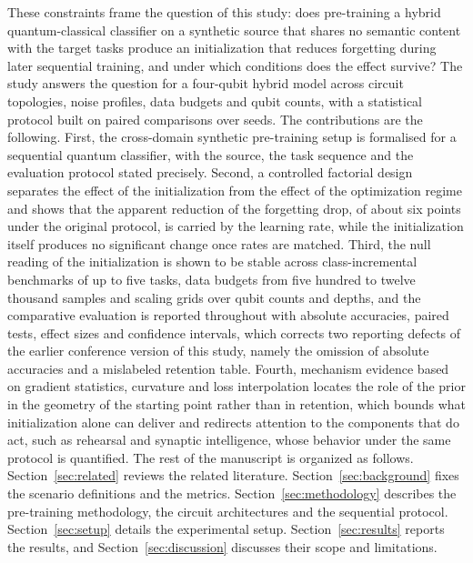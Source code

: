 \documentclass[preprint,number,sort&compress]{elsarticle}
\begin{document}
These constraints frame the question of this study: does pre-training a
hybrid quantum-classical classifier on a synthetic source that shares no
semantic content with the target tasks produce an initialization that
reduces forgetting during later sequential training, and under which
conditions does the effect survive? The study answers the question for a
four-qubit hybrid model across circuit topologies, noise profiles, data
budgets and qubit counts, with a statistical protocol built on paired
comparisons over seeds.
The contributions are the following. First, the cross-domain synthetic
pre-training setup is formalised for a sequential quantum classifier, with
the source, the task sequence and the evaluation protocol stated precisely.
Second, a controlled factorial design separates the effect of the
initialization from the effect of the optimization regime and shows that
the apparent reduction of the forgetting drop, of about six points under
the original protocol, is carried by the learning rate, while the
initialization itself produces no significant change once rates are
matched. Third, the null reading of the initialization is shown to be
stable across class-incremental benchmarks of up to five tasks, data
budgets from five hundred to twelve thousand samples and scaling grids
over qubit counts and depths, and the comparative evaluation is reported
throughout with absolute accuracies, paired tests, effect sizes and
confidence intervals, which corrects two reporting defects of the earlier
conference version of this study, namely the omission of absolute
accuracies and a mislabeled retention table. Fourth, mechanism evidence
based on gradient statistics, curvature and loss interpolation locates the
role of the prior in the geometry of the starting point rather than in
retention, which bounds what initialization alone can deliver and
redirects attention to the components that do act, such as rehearsal and
synaptic intelligence, whose behavior under the same protocol is quantified. The rest of the
manuscript is organized as
follows. Section~\ref{sec:related} reviews the related literature.
Section~\ref{sec:background} fixes the scenario definitions and the metrics.
Section~\ref{sec:methodology} describes the pre-training methodology, the
circuit architectures and the sequential protocol.
Section~\ref{sec:setup} details the experimental setup.
Section~\ref{sec:results} reports the results, and
Section~\ref{sec:discussion} discusses their scope and limitations.

\end{document}
